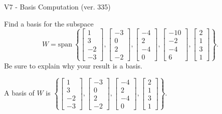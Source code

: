 \begin{exercise}
  \begin{exerciseTitle}V7 - Basis Computation (ver. 335)\end{exerciseTitle}
  \begin{exerciseStatement}
    Find a basis for the subspace 
\[W=\mathrm{span}\ \left\{\left[\begin{array}{r}
1 \\
3 \\
-2 \\
-3
\end{array}\right] , \left[\begin{array}{r}
-3 \\
0 \\
2 \\
-2
\end{array}\right] , \left[\begin{array}{r}
-4 \\
2 \\
-4 \\
0
\end{array}\right] , \left[\begin{array}{r}
-10 \\
-2 \\
-4 \\
6
\end{array}\right] , \left[\begin{array}{r}
2 \\
1 \\
3 \\
1
\end{array}\right]\right\}.\]
 Be sure to explain why your result is a basis.


  \end{exerciseStatement}
  \begin{exerciseAnswer}
   A basis of \(W\) is  \(\left\{\left[\begin{array}{r}
1 \\
3 \\
-2 \\
-3
\end{array}\right] , \left[\begin{array}{r}
-3 \\
0 \\
2 \\
-2
\end{array}\right] , \left[\begin{array}{r}
-4 \\
2 \\
-4 \\
0
\end{array}\right] , \left[\begin{array}{r}
2 \\
1 \\
3 \\
1
\end{array}\right]\right\}\).
  


  \end{exerciseAnswer}
\end{exercise}